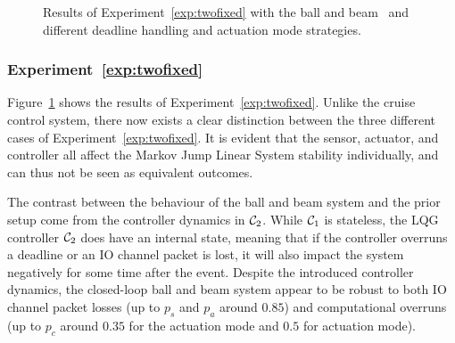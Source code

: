 \begin{figure}[t]
    \caption{Results of Experiment~\ref{exp:twofixed} with the ball and beam~\cite{Vreman:2022} and different deadline handling and actuation mode strategies.}
    \label{fig:nils-fix2}
\end{figure}

\subsubsection*{Experiment~\ref{exp:twofixed}}%
%
Figure~\ref{fig:nils-fix2} shows the results of Experiment~\ref{exp:twofixed}.
Unlike the cruise control system, there now exists a clear distinction between the three different cases of Experiment~\ref{exp:twofixed}.
It is evident that the sensor, actuator, and controller all affect the Markov Jump Linear System stability individually, and can thus not be seen as equivalent outcomes.

The contrast between the behaviour of the ball and beam system and the prior setup come from the controller dynamics in $\mathcal{C}_2$.
While $\mathcal{C}_1$ is stateless, the LQG controller $\mathcal{C}_2$ does have an internal state, meaning that if the controller overruns a deadline or an IO channel packet is lost, it will also impact the system negatively for some time after the event.
Despite the introduced controller dynamics, the closed-loop ball and beam system appear to be robust to both IO channel packet losses (up to $p_s$ and $p_a$ around $0.85$) and computational overruns (up to $p_c$ around $0.35$ for the \tZ{} actuation mode and $0.5$ for \tH{} actuation mode).

